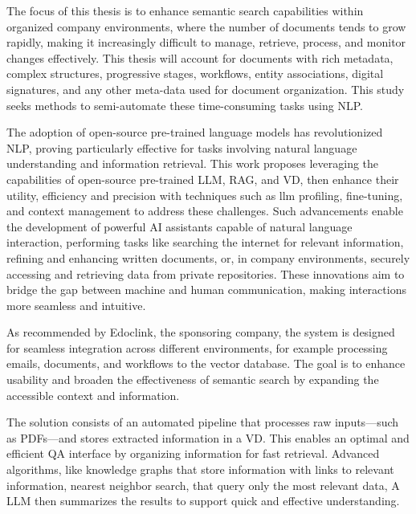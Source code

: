 \acresetall
\noindent  The focus of this thesis is to enhance semantic search capabilities within organized company environments, where the number of documents tends to grow rapidly, making it increasingly difficult to manage, retrieve, process, and monitor changes effectively. This thesis will account for documents with rich metadata, complex structures, progressive stages, workflows, entity associations, digital signatures, and any other meta-data used for document organization. This study seeks methods to semi-automate these time-consuming tasks using \ac{NLP}.

The adoption of open-source pre-trained language models has revolutionized \ac{NLP}, proving particularly effective for tasks involving natural language understanding and information retrieval. This work proposes leveraging the capabilities of open-source pre-trained \ac{LLM}, \ac{RAG}, and \ac{VD}, then enhance their utility, efficiency and precision with techniques such as llm profiling, fine-tuning, and context management to address these challenges. Such advancements enable the development of powerful AI assistants capable of natural language interaction, performing tasks like searching the internet for relevant information, refining and enhancing written documents, or, in company environments, securely accessing and retrieving data from private repositories. These innovations aim to bridge the gap between machine and human communication, making interactions more seamless and intuitive.

As recommended by Edoclink, the sponsoring company, the system is designed for seamless integration across different environments, for example processing emails, documents, and workflows to the vector database. The goal is to enhance usability and broaden the effectiveness of semantic search by expanding the accessible context and information.

The solution consists of an automated pipeline that processes raw inputs—such as PDFs—and stores extracted information in a \ac{VD}. This enables an optimal and efficient \ac{QA} interface by organizing information for fast retrieval. Advanced algorithms, like  knowledge graphs that store information with links to relevant information, nearest neighbor search, that query only the most relevant data,  A \ac{LLM} then summarizes the results to support quick and effective understanding.
